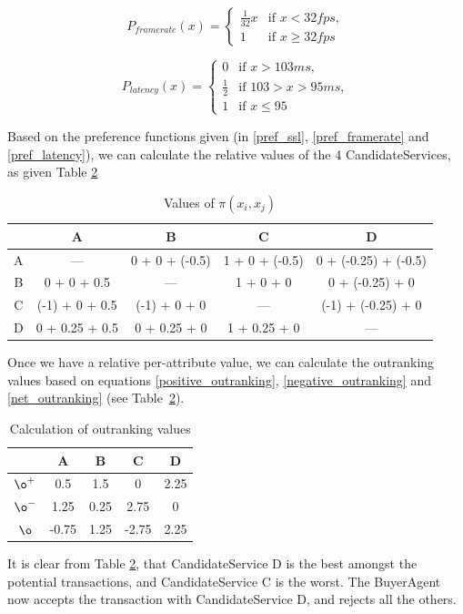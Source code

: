 \documentclass[10pt,journal,compsoc]{IEEEtran}
\begin{document}
	\begin{equation}
		P_{framerate}(x) = \begin{cases} \frac{1}{32}x &\mbox{if } x < 32fps,\\ 
										1 &\mbox{if } x \geq 32fps \end{cases}
			\label{pref_framerate}										
	\end{equation}
	
	\begin{equation}
		P_{latency}(x) = \begin{cases} 0 &\mbox{if } x > 103ms,\\ 
									   \frac{1}{2}	 &\mbox{if } 103 > x > 95ms, \\
										1 &\mbox{if } x \leq 95 \end{cases}
			\label{pref_latency}
	\end{equation}
	
Based on the preference functions given (in \ref{pref_ssl}, \ref{pref_framerate} and \ref{pref_latency}), we can calculate the relative values of the 4 CandidateServices, as given Table \ref{tbl:outranking_table}
	\begin{table}[htbp]
		\centering
		\caption{Values of $\pi(x_i, x_j)$ \label{tbl_ranking_values}}
		\begin{tabular}{c|cccc}
		\toprule
		  & A & B & C & D \\
		\midrule
		A & --- & 0 + 0 + (-0.5) & 1 + 0 + (-0.5) & 0 + (-0.25) + (-0.5) \\
		B & 0 + 0 + 0.5 & --- & 1 + 0 + 0 & 0 + (-0.25) + 0 \\
		C & (-1) + 0 + 0.5 & (-1) + 0 + 0 & --- & (-1) + (-0.25) + 0 \\
		D & 0 + 0.25 + 0.5 & 0 + 0.25 + 0 & 1 + 0.25 + 0 & --- \\
		\bottomrule
		\end{tabular}
	\end{table}
Once we have a relative per-attribute value, we can calculate the outranking values based on equations \ref{positive_outranking}, \ref{negative_outranking} and \ref{net_outranking} (see Table~\ref{tbl:outranking_table}).

	\begin{table}[htbp]
		\centering
		\renewcommand{\arraystretch}{1.5}
		\begin{tabular}{c|cccc}
		\toprule
		   			& A & B & C & D \\
		\midrule
			$\o^{+}$	& 0.5 & 1.5 & 0 & 2.25 \\
			$\o^{-}$	& 1.25 & 0.25 & 2.75 & 0 \\
			\hline
			$\o$		& -0.75 & 1.25 & -2.75 & 2.25 \\
		\bottomrule
		\end{tabular}			
		\caption{Calculation of outranking values \label{tbl:outranking_table}}
	\end{table}
It is clear from Table \ref{tbl:outranking_table}, that CandidateService D is the best amongst the potential transactions, and CandidateService C is the worst. The BuyerAgent now accepts the transaction with CandidateService D, and rejects all the others. 
\end{document}
